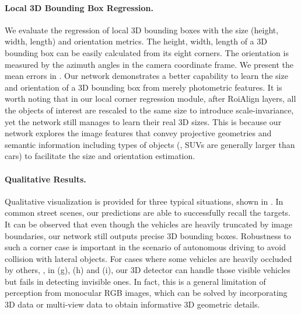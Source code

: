     

\paragraph{Local 3D Bounding Box Regression.}
We evaluate the regression of local 3D bounding boxes with the size (height, width, length) and orientation metrics.
The height, width, length of a 3D bounding box can be easily calculated from its eight corners. The orientation is measured by the azimuth angles in the camera coordinate frame. We present the mean errors in \tab{\ref{tab:3dparams}}. Our network demonstrates a better capability to learn the size and orientation of a 3D bounding box from merely photometric features. 
It is worth noting that in our local corner regression module, after RoiAlign layers, all the objects of interest are rescaled to the same size to introduce scale-invariance, yet the network still manages to learn their real 3D sizes. 
This is because our network explores the image features that convey projective geometries and semantic information including types of objects (\eg, SUVs are generally larger than cars) to facilitate the size and orientation estimation.


\paragraph{Qualitative Results.}
 Qualitative visualization is provided for three typical situations, shown in \fig{\ref{fig:visualize3d}}. In common street scenes, our predictions are able to successfully recall the targets. It can be observed that even though the vehicles are heavily truncated by image boundaries, our network still outputs precise 3D bounding boxes. Robustness to such a corner case is important in the scenario of autonomous driving to avoid collision with lateral objects. For cases where some vehicles are heavily occluded by others, \ie, in (g), (h) and (i), our 3D detector can handle those visible vehicles but fails in detecting invisible ones. In fact, this is a general limitation of perception from monocular RGB images, which can be solved by incorporating 3D data or multi-view data to obtain informative 3D geometric details.

